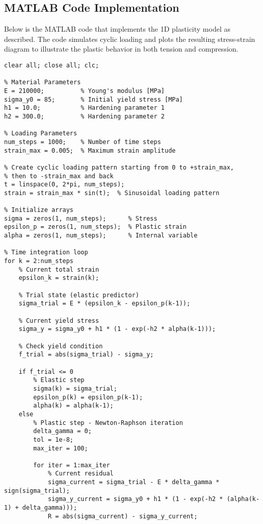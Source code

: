 \documentclass{article}
\begin{document}
\subsection{MATLAB Code Implementation}

Below is the MATLAB code that implements the 1D plasticity model as described. The code simulates cyclic loading and plots the resulting stress-strain diagram to illustrate the plastic behavior in both tension and compression.

\begin{lstlisting}[caption={MATLAB Code for 1D Plasticity Problem}, label={lst:plasticity}]
% 1D Plasticity Solver with Nonlinear Hardening
clear all; close all; clc;

% Material Parameters
E = 210000;          % Young's modulus [MPa]
sigma_y0 = 85;       % Initial yield stress [MPa]
h1 = 10.0;           % Hardening parameter 1
h2 = 300.0;          % Hardening parameter 2

% Loading Parameters
num_steps = 1000;    % Number of time steps
strain_max = 0.005;  % Maximum strain amplitude

% Create cyclic loading pattern starting from 0 to +strain_max, 
% then to -strain_max and back
t = linspace(0, 2*pi, num_steps);
strain = strain_max * sin(t);  % Sinusoidal loading pattern

% Initialize arrays
sigma = zeros(1, num_steps);      % Stress
epsilon_p = zeros(1, num_steps);  % Plastic strain
alpha = zeros(1, num_steps);      % Internal variable

% Time integration loop
for k = 2:num_steps
    % Current total strain
    epsilon_k = strain(k);
    
    % Trial state (elastic predictor)
    sigma_trial = E * (epsilon_k - epsilon_p(k-1));
    
    % Current yield stress
    sigma_y = sigma_y0 + h1 * (1 - exp(-h2 * alpha(k-1)));
    
    % Check yield condition
    f_trial = abs(sigma_trial) - sigma_y;
    
    if f_trial <= 0
        % Elastic step
        sigma(k) = sigma_trial;
        epsilon_p(k) = epsilon_p(k-1);
        alpha(k) = alpha(k-1);
    else
        % Plastic step - Newton-Raphson iteration
        delta_gamma = 0;
        tol = 1e-8;
        max_iter = 100;
        
        for iter = 1:max_iter
            % Current residual
            sigma_current = sigma_trial - E * delta_gamma * sign(sigma_trial);
            sigma_y_current = sigma_y0 + h1 * (1 - exp(-h2 * (alpha(k-1) + delta_gamma)));
            R = abs(sigma_current) - sigma_y_current;
            

\end{lstlisting}
\end{document}
